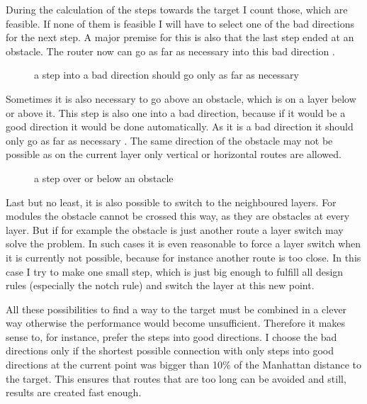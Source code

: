 During the calculation of the steps towards the target I count those, which are feasible. If none of them is feasible I will have to select one of the bad directions for the next step. A major premise for this is also that the last step ended at an obstacle. The router now can go as far as necessary into this bad direction .

\begin{figure}
	\centering
	
 	\caption{a step into a bad direction should go only as far as necessary}
	\label{fig:router_as_far_as_necessary}
\end{figure}

Sometimes it is also necessary to go above an obstacle, which is on a layer below or above it. This step is also one into a bad direction, because if it would be a good direction it would be done automatically. As it is a bad direction it should only go as far as necessary . The same direction of the obstacle may not be possible as on the current layer only vertical or horizontal routes are allowed.

\begin{figure}
	\centering
	
 	\caption{a step over or below an obstacle}
	\label{fig:router_as_far_as_necessary_above}
\end{figure}

Last but no least, it is also possible to switch to the neighboured layers. For modules the obstacle cannot be crossed this way, as they are obstacles at every layer. But if for example the obstacle is just another route a layer switch may solve the problem. In such cases it is even reasonable to force a layer switch when it is currently not possible, because for instance another route is too close. In this case I try to make one small step, which is just big enough to fulfill all design rules (especially the notch rule) and switch the layer at this new point.

All these possibilities to find a way to the target must be combined in a clever way otherwise the performance would become unsufficient. Therefore it makes sense to, for instance, prefer the steps into good directions. I choose the bad directions only if the shortest possible connection with only steps into good directions at the current point was bigger than 10\% of the Manhattan distance to the target. This ensures that routes that are too long can be avoided and still, results are created fast enough.

